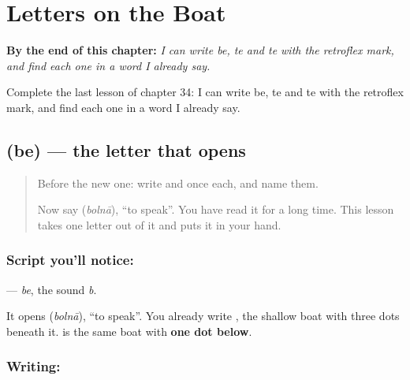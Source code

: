 
\chapter{Letters on the Boat}
\label{ch:ur-letters-on-the-boat}

\begin{chapteropening}
\textbf{By the end of this chapter:} \emph{I can write be, te and te with the retroflex mark, and find each one in a word I already say.}

Complete the last lesson of chapter 34: I can write be, te and te with the retroflex mark, and find each one in a word I already say.
\end{chapteropening}

\section[\texorpdfstring{\ur{ب} (be)}{ب (be)}]{ (be) — the letter that opens }

\label{lesson:UR-W34-be}



\begin{quote}
Before the new one: write  and  once each, and name them.

Now say \textbf{} (\emph{bolnā}), \textquotedblleft{}to speak\textquotedblright{}. You have read it for a long time. This lesson takes one letter out of it and puts it in your hand.
\end{quote}

\subsection*{Script you'll notice: }
\textbf{} — \emph{be}, the sound \emph{b}.

It opens \textbf{} (\emph{bolnā}), \textquotedblleft{}to speak\textquotedblright{}. You already write \textbf{}, the shallow boat with three dots beneath it. \textbf{} is the same boat with \textbf{one dot below}.

\subsection*{Writing: }

